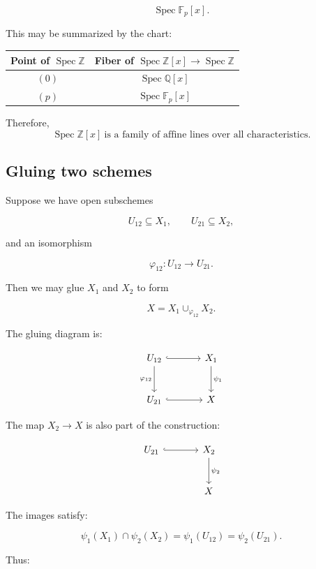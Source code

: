 \documentclass[12pt,a4paper]{article}
\newcommand{\ZZ}{\mathbb Z}
\newcommand{\Spec}{\operatorname{Spec}}
\theoremstyle{notespace}
\begin{document}
\[
\Spec\mathbb F_p[x].
\]

This may be summarized by the chart:

\begin{center}
	\begin{tabular}{c|c}
		\toprule
		\textbf{Point of \(\Spec\ZZ\)}
		&
		\textbf{Fiber of \(\Spec\ZZ[x]\to\Spec\ZZ\)}
		\\
		\midrule
		\((0)\)
		&
		\(\Spec\mathbb Q[x]\)
		\\
		\midrule
		\((p)\)
		&
		\(\Spec\mathbb F_p[x]\)
		\\
		\bottomrule
	\end{tabular}
\end{center}

Therefore,
\[
\boxed{
	\Spec\ZZ[x]\ \text{is a family of affine lines over all characteristics.}
}
\]

\subsection{Gluing two schemes}

Suppose we have open subschemes

\[
U_{12}\subseteq X_1,
\qquad
U_{21}\subseteq X_2,
\]

and an isomorphism

\[
\varphi_{12}:U_{12}\to U_{21}.
\]

Then we may glue \(X_1\) and \(X_2\) to form

\[
X=X_1\cup_{\varphi_{12}}X_2.
\]

The gluing diagram is:

\[
\begin{tikzcd}[column sep=large,row sep=large]
	U_{12} \arrow[r,hook] \arrow[d,"\varphi_{12}"']
	&
	X_1 \arrow[d,"\psi_1"]
	\\
	U_{21} \arrow[r,hook]
	&
	X
\end{tikzcd}
\]

The map \(X_2\to X\) is also part of the construction:

\[
\begin{tikzcd}[column sep=large,row sep=large]
	U_{21} \arrow[r,hook]
	&
	X_2 \arrow[d,"\psi_2"]
	\\
	&
	X
\end{tikzcd}
\]

The images satisfy:

\[
\psi_1(X_1)\cap\psi_2(X_2)
=
\psi_1(U_{12})
=
\psi_2(U_{21}).
\]

Thus:
\end{document}
